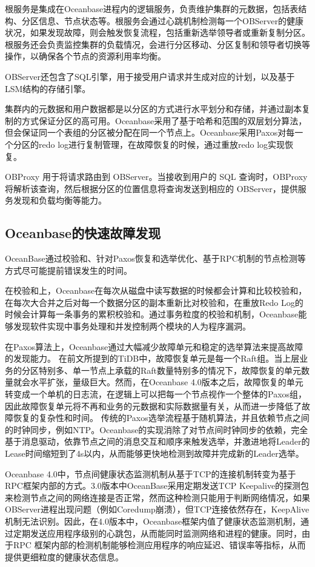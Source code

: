 根服务是集成在Oceanbase进程内的逻辑服务，负责维护集群的元数据，包括表结构、分区信息、节点状态等。根服务会通过心跳机制检测每一个OBServer的健康状况，如果发现故障，则会触发恢复流程，包括重新选举领导者或重新复制分区。根服务还会负责监控集群的负载情况，会进行分区移动、分区复制和领导者切换等操作，以确保各个节点的资源利用率均衡。

OBServer还包含了SQL引擎，用于接受用户请求并生成对应的计划，以及基于LSM结构的存储引擎。

集群内的元数据和用户数据都是以分区的方式进行水平划分和存储，并通过副本复制的方式保证分区的高可用。Oceanbase采用了基于哈希和范围的双层划分算法，但会保证同一个表组的分区被分配在同一个节点上。Oceanbase采用Paxos对每一个分区的redo log进行复制管理，在故障恢复的时候，通过重放redo log实现恢复。

OBProxy 用于将请求路由到 OBServer。当接收到用户的 SQL 查询时，OBProxy 将解析该查询，然后根据分区的位置信息将查询发送到相应的 OBServer，提供服务发现和负载均衡等能力。


\subsection{Oceanbase的快速故障发现}

OceanBase通过校验和、针对Paxos恢复和选举优化、基于RPC机制的节点检测等方式尽可能提前错误发生的时间。

在校验和上，Oceanbase在每次从磁盘中读写数据的时候都会计算和比较校验和，在每次大合并之后对每一个数据分区的副本重新比对校验和，在重放Redo Log的时候会计算每一条事务的累积校验和。通过事务粒度的校验和机制，Oceanbase能够发现软件实现中事务处理和并发控制两个模块的人为程序漏洞。

在Paxos算法上，Oceanbase通过大幅减少故障单元和稳定的选举算法来提高故障的发现能力。
在前文所提到的TiDB中，故障恢复单元是每一个Raft组。当上层业务的分区特别多、单一节点上承载的Raft数量特别多的情况下，故障恢复的单元数量就会水平扩张，量级巨大。然而，在Oceanbase 4.0版本之后，故障恢复的单元转变成一个单机的日志流，在逻辑上可以把每一个节点视作一个整体的Paxos组，因此故障恢复单元将不再和业务的元数据和实际数据量有关，从而进一步降低了故障恢复的复杂性和时间。
传统的Paxos选举流程基于随机算法，并且依赖节点之间的时钟同步，例如NTP。Oceanbase的实现消除了对节点间时钟同步的依赖，完全基于消息驱动，依靠节点之间的消息交互和顺序来触发选举，并激进地将Leader的Lease时间缩短到了4s以内，从而能够更快地检测到故障并完成新的Leader选举。

Oceanbase 4.0中，节点间健康状态监测机制从基于TCP的连接机制转变为基于RPC框架内部的方式。3.0版本中OceanBase采用定期发送TCP Keepalive的探测包来检测节点之间的网络连接是否正常，然而这种检测只能用于判断网络情况，如果OBServer进程出现问题（例如Coredump崩溃），但TCP连接依然存在，KeepAlive机制无法识别。因此，在4.0版本中，Oceanbase框架内值了健康状态监测机制，通过定期发送应用程序级别的心跳包，从而能同时监测网络和进程的健康。同时，由于RPC 框架内部的检测机制能够检测应用程序的响应延迟、错误率等指标，从而提供更细粒度的健康状态信息。

